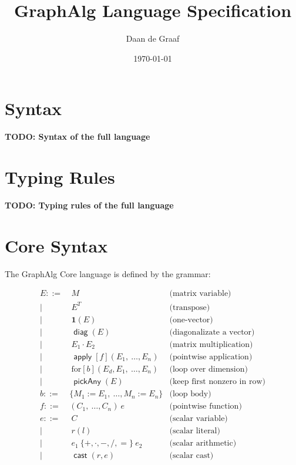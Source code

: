 \documentclass{article}
\title{GraphAlg Language Specification}
\author{Daan de Graaf}
\date{\today}
\newcommand\graphalg{\textsf{GraphAlg}}
\DeclareMathOperator{\pickAny}{\mathsf{pickAny}}
\DeclareMathOperator{\cast}{\mathsf{cast}}
\newcommand{\rowdom}{\mathbf{1}}
\DeclareMathOperator{\diag}{\mathsf{diag}}
\DeclareMathOperator{\Apply}{\mathsf{apply}}
\newcommand{\one}{\rowdom}
\begin{document}
\maketitle

\section{Syntax}
\textbf{TODO: Syntax of the full language}

\section{Typing Rules}
\textbf{TODO: Typing rules of the full language}

\section{Core Syntax}
The \graphalg{} Core language is defined by the grammar:

\begin{align*}
    E ::= & \ M                                    & \text{(matrix variable)}           \\
    |     & \ E^{T}                                & \text{(transpose)}                 \\
    |     & \ \one(E)                              & \text{(one-vector)}                \\
    |     & \ \diag(E)                             & \text{(diagonalizate a vector)}    \\
    |     & \ E_1 \cdot E_2                        & \text{(matrix multiplication)}     \\
    |     & \ \Apply[f](E_1,\ \ldots,E_n)          & \text{(pointwise application)}     \\
    |     & \ \text{for}[b](E_d, E_1,\ \ldots,E_n) & \text{(loop over dimension)}       \\
    |     & \ \pickAny(E)                          & \text{(keep first nonzero in row)} \\
    b ::= & \{ M_1 := E_1,\ \ldots, M_n := E_n \}  & \text{(loop body)}                 \\
    f ::= & (C_1,\ \ldots,C_n) \ e                 & \text{(pointwise function)}        \\
    e ::= & \ C                                    & \text{(scalar variable)}           \\
    |     & \ r(l)                                 & \text{(scalar literal)}            \\
    |     & \ e_1 \ \{+,\cdot,-,/,=\} \ e_2        & \text{(scalar arithmetic)}         \\
    |     & \ \cast(r, e)                          & \text{(scalar cast)}               \\
\end{align*}
\end{document}
